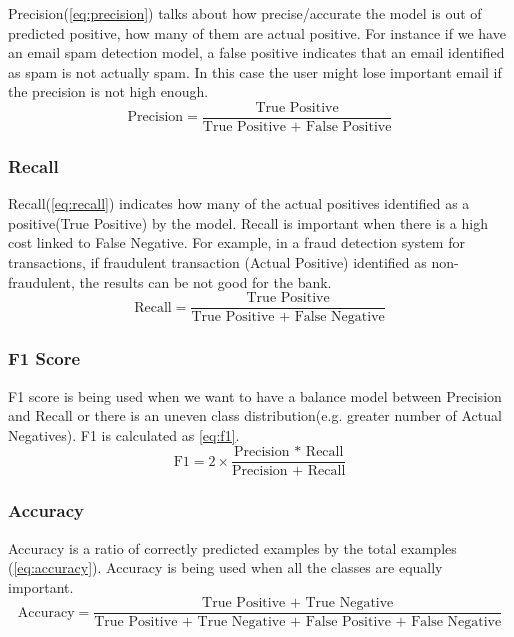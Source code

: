 Precision(\ref{eq:precision}) talks about how precise/accurate the model is out of predicted positive, how many of them are actual positive. For instance if we have an email spam detection model, a false positive indicates that an email identified as spam is not actually spam. In this case the user might lose important email if the precision is not high enough. 
\begin{equation}
    \text{Precision} = \frac{\text{True Positive}}{\text{True Positive + False Positive}}
    \label{eq:precision}
\end{equation}

\subsubsection{Recall}
Recall(\ref{eq:recall}) indicates how many of the actual positives identified as a positive(True Positive) by the model. Recall is important when there is a high cost linked to False Negative. For example, in a fraud detection system for transactions, if fraudulent transaction (Actual Positive) identified as non-fraudulent, the results can be not good for the bank. 
\begin{equation}
    \text{Recall} = \frac{\text{True Positive}}{\text{True Positive + False Negative}}
    \label{eq:recall}
\end{equation}

\subsubsection{F1 Score}
F1 score is being used when we want to have a balance model between Precision and Recall or there is an uneven class distribution(e.g. greater number of Actual Negatives). F1 is calculated as \cref{eq:f1}.
\begin{equation}
    \text{F1} = 2 \times \frac{\text{Precision * Recall}}{\text{Precision + Recall}}
    \label{eq:f1}
\end{equation}

\subsubsection{Accuracy}
Accuracy is a ratio of correctly predicted examples by the total examples (\ref{eq:accuracy}). Accuracy is being used when all the classes are equally important. 
\begin{equation}
    \text{Accuracy} = \frac{\text{True Positive + True Negative}}{\text{True Positive + True Negative + False Positive + False Negative}}
    \label{eq:accuracy}
\end{equation}



